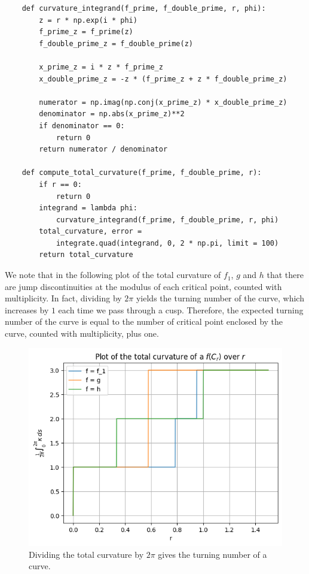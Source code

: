 \documentclass{article}
\begin{document}
\begin{verbatim}
    def curvature_integrand(f_prime, f_double_prime, r, phi):
        z = r * np.exp(i * phi)
        f_prime_z = f_prime(z)
        f_double_prime_z = f_double_prime(z)
    
        x_prime_z = i * z * f_prime_z
        x_double_prime_z = -z * (f_prime_z + z * f_double_prime_z)
        
        numerator = np.imag(np.conj(x_prime_z) * x_double_prime_z)
        denominator = np.abs(x_prime_z)**2
        if denominator == 0:
            return 0
        return numerator / denominator
    
    def compute_total_curvature(f_prime, f_double_prime, r):
        if r == 0:
            return 0
        integrand = lambda phi: 
            curvature_integrand(f_prime, f_double_prime, r, phi)
        total_curvature, error = 
            integrate.quad(integrand, 0, 2 * np.pi, limit = 100)
        return total_curvature    
\end{verbatim}

We note that in the following plot of the total curvature of \(f_1\), \(g\) and \(h\) that there are jump discontinuities at the modulus of each critical point, counted with multiplicity. In fact, dividing by \(2\pi\) yields the turning number of the curve, which increases by \(1\) each time we pass through a cusp. Therefore, the expected turning number of the curve is equal to the number of critical point enclosed by the curve, counted with multiplicity, plus one.

\begin{figure}
    \centering
    \includegraphics[width=1.0\linewidth]{images/winding_number.png}
    \caption{Dividing the total curvature by \(2\pi\) gives the turning number of a curve.}
\end{figure}
\end{document}
